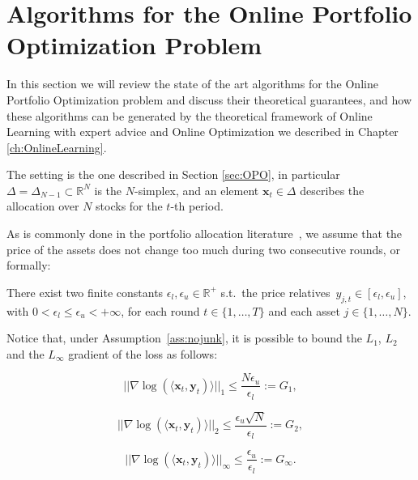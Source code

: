 \chapter{Algorithms for the Online Portfolio Optimization Problem}\label{ch:algos}

In this section we will review the state of the art algorithms for the Online Portfolio Optimization problem and discuss their theoretical guarantees, and how these algorithms can be generated by the theoretical framework of Online Learning with expert advice and Online Optimization we described in Chapter \ref{ch:OnlineLearning}.

The setting is the one described in Section \ref{sec:OPO}, in particular $\Delta=\Delta_{N-1}\subset \mathbb R^N$ is the $N$-simplex, and an element $\mathbf x_t\in\Delta$ describes the allocation over $N$ stocks for the $t$-th period.

As is commonly done in the portfolio allocation literature~\cite{agarwal2006algorithms}, we assume that the price of the assets does not change too much during two consecutive rounds, or formally:

\begin{assumption} \label{ass:nojunk}
     There exist two finite constants $\epsilon_l, \epsilon_u \in \mathbb{R}^+$ s.t.~the price relatives~$y_{j,t} \in [\epsilon_l, \epsilon_u]$, with $0 < \epsilon_l \leq \epsilon_u < +\infty$, for each round $t \in \{ 1, \ldots, T \}$ and each asset $j \in \{1, \ldots, N \}$.
\end{assumption}

Notice that, under Assumption~\ref{ass:nojunk}, it is possible to bound the $L_1$, $L_2$ and the $L_\infty$ gradient of the loss as follows:

\begin{equation} \label{eq:bounded_gradient_1}
    ||\nabla \log (\langle \mathbf{x}_t, \mathbf{y}_t) \rangle||_1 \leq \frac{N\epsilon_u}{\epsilon_l}:=G_1,
\end{equation}

\begin{equation} \label{eq:bounded_gradient_2}
    ||\nabla \log (\langle \mathbf{x}_t, \mathbf{y}_t) \rangle||_2 \leq \frac{\epsilon_u \sqrt{N}}{\epsilon_l}:=G_2,
\end{equation}

\begin{equation} \label{eq:bounded_gradient_3}
    ||\nabla \log (\langle \mathbf{x}_t, \mathbf{y}_t) \rangle||_\infty \leq \frac{\epsilon_u }{\epsilon_l}:=G_\infty.
\end{equation}

